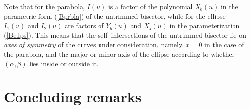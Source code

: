 \begin{rmk}
{\rm
Note that for the parabola, $I(u)$ is a factor of the polynomial $X_b(u)$
in the parametric form (\ref{Bprbla}) of the untrimmed bisector, while for
the ellipse $I_1(u)$ and $I_2(u)$ are factors of $Y_b(u)$ and $X_b(u)$ in
the parameterization (\ref{Bellps}). This means that the self--intersections
of the untrimmed bisector lie on {\it axes of symmetry\/} of the curves
under consideration, namely, $x=0$ in the case of the parabola, and the
major or minor axis of the ellipse according to whether $(\alpha,\beta)$
lies inside or outside it.
}
\end{rmk}

\section{Concluding remarks}
\label{conclusion}

